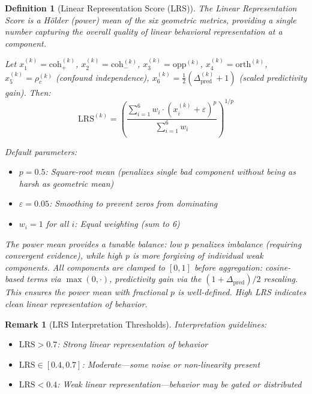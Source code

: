 \documentclass[11pt]{article}
\newtheorem{definition}{Definition}[section]
\newtheorem{remark}{Remark}[section]
\begin{document}
\begin{definition}[Linear Representation Score (LRS)]
\label{def:lrs}
The Linear Representation Score is a Hölder (power) mean of the six geometric metrics, providing a single number capturing the overall quality of linear behavioral representation at a component.

Let $x^{(k)}_1 = \text{coh}^{(k)}_+$, $x^{(k)}_2 = \text{coh}^{(k)}_-$, $x^{(k)}_3 = \text{opp}^{(k)}$, $x^{(k)}_4 = \text{orth}^{(k)}$, $x^{(k)}_5 = \rho^{(k)}_c$ (confound independence), $x^{(k)}_6 = \frac{1}{2}(\Delta_{\text{pred}}^{(k)} + 1)$ (scaled predictivity gain). Then:
\begin{equation}
\text{LRS}^{(k)} = \left(\frac{\sum_{i=1}^6 w_i \cdot (x^{(k)}_i + \varepsilon)^p}{\sum_{i=1}^6 w_i}\right)^{1/p}
\end{equation}

\begin{samepage}
Default parameters:
\begin{itemize}[nosep]
\item $p = 0.5$: Square-root mean (penalizes single bad component without being as harsh as geometric mean)
\item $\varepsilon = 0.05$: Smoothing to prevent zeros from dominating
\item $w_i = 1$ for all $i$: Equal weighting (sum to 6)
\end{itemize}
\end{samepage}

\noindent The power mean provides a tunable balance: low $p$ penalizes imbalance (requiring convergent evidence), while high $p$ is more forgiving of individual weak components. All components are clamped to $[0, 1]$ before aggregation: cosine-based terms via $\max(0, \cdot)$, predictivity gain via the $(1 + \Delta_{\text{pred}})/2$ rescaling. This ensures the power mean with fractional $p$ is well-defined. High LRS indicates clean linear representation of behavior.
\end{definition}

\begin{remark}[LRS Interpretation Thresholds]
\label{rem:lrs-interpretation-thresholds}
Interpretation guidelines:
\begin{itemize}[nosep]
\item $\text{LRS} > 0.7$: Strong linear representation of behavior
\item $\text{LRS} \in [0.4, 0.7]$: Moderate---some noise or non-linearity present
\item $\text{LRS} < 0.4$: Weak linear representation---behavior may be gated or distributed
\end{itemize}
\end{remark}
\end{document}
